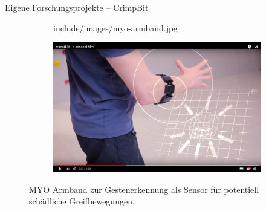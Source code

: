 \begin{frame}{Eigene Forschungsprojekte -- Crimp\textcolor{tracker}{Bit}}
\begin{figure}[h]
	\centering
	\begin{subfigure}[t]{0.35\columnwidth}
		\centering
		\begin{overpic}[width=\textwidth]{include/images/myo-armband.jpg}
		\end{overpic}
		\label{fig:myo-armband}
	\end{subfigure}
	\hspace*{\fill}
	\begin{subfigure}[t]{0.62\columnwidth}
		\centering
		\includegraphics[width=\textwidth]{include/images/myo-demo.jpg}
		\label{fig:crimpbit-demo}
	\end{subfigure}
	\caption{MYO Armband zur Gestenerkennung als Sensor für potentiell schädliche Greifbewegungen.}
	\label{fig:crimpbit}
\end{figure}
\end{frame}

